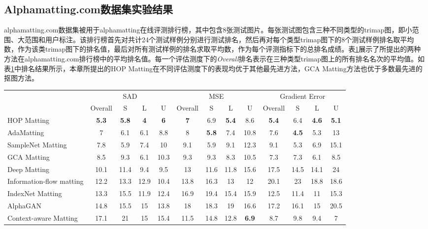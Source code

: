 \subsection{Alphamatting.com数据集实验结果}
alphamatting.com数据集被用于alphamatting在线评测排行榜，其中包含8张测试图片。每张测试图包含三种不同类型的trimap图，即小范围、大范围和用户标注。该排行榜首先对共计24个测试样例分别进行测试排名，然后再对每个类型trimap图下的8个测试样例排名取平均数，作为该类trimap图下的排名值，最后对所有测试样例的排名求取平均数，作为每个评测指标下的总排名成绩。表\ref{tab5:alphamatting}展示了所提出的两种方法在alphamatting.com排行榜中的平均排名值。每一个评估测度下的\textit{Overall}排名表示在三种类型trimap图上的所有排名名次的平均值。如表\ref{tab5:alphamatting}中排名结果所示，本章所提出的HOP Matting在不同评估测度下的表现均优于其他最先进方法，GCA Matting方法也优于多数最先进的抠图方法。

\begin{table}[t]
\small
\centering
\begin{tabular}{l|c|ccc|c|ccc|c|ccc}
	\toprule
	\footnotesize
	\multirow{2}{*}{Average Rank} & \multicolumn{4}{c|}{SAD}& \multicolumn{4}{c|}{MSE}& \multicolumn{4}{c}{Gradient Error}\\
	& Overall&S&L&U& Overall&S&L&U& Overall&S&L&U\\
	\midrule
	HOP Matting&	\textbf{5.3}&	\textbf{5.8}	&\textbf{4}&	\textbf{6}&	\textbf{7}&	6.9&\textbf{5.4}	&8.6&\textbf{5.4}	&6.4&	\textbf{4.6}&	\textbf{5.1} \\		
	AdaMatting\cite{cai2019disentangled} &7&	6.1	&6.1&	8.8 &8&	\textbf{5.8}	&7.4&	10.8&7.6&	\textbf{4.5}&	5.3&	13\\		
	SampleNet Matting\cite{samplenet} &	7.8&5.9&	7.4&	10 &	9.1	&5.9&	9.1	&12.3&	9.1	&5.3&	6.9	&15.1\\		
	GCA Matting	&8.5&	9.3	&6.1&	10.3&9.3	&9.3&	8.3	&10.5&7.3&	7.3&	6.1&	8.5	 \\		
	Deep Matting\cite{xu2017deep}&10.1&	11.4&	9.4	&9.5&13	&11.6&	11.8&	15.6	&17.5&	14.5&	14.1&	24\\		
	Information-flow matting \cite{aksoy2017designing}&12.2&	13.3&	12.9&	10.4&13.8&	16.3&	13&	12&	20.1&	23	&18.8&	18.6\\		
	IndexNet Matting\cite{lu2019indices}&13.3&	15.5&	11.9&	12.4	&16.9&	19.4&	15.4&	15.9	&12.5&	11.4&	11&	15.3	\\		
	AlphaGAN\cite{cai2019disentangled}&14.8&	15.5&	15&	13.8&18&	18.3&	19&	16.6&17.2&	16.1&	15&	20.5\\
	Context-aware Matting\cite{hou2019context}&	17.1&	21&	15&	15.4&11.5&	14.8&	12.8	&\textbf{6.9}&8.7&	9.8&	9.4	&7	\\	
	\bottomrule
\end{tabular}
\label{tab5:alphamatting}
\end{table}


